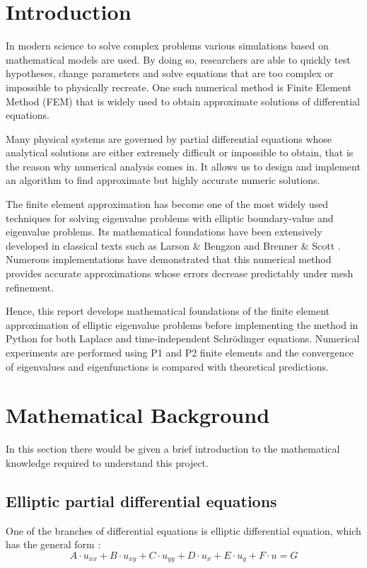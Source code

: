 \documentclass[acmsmall,screen]{MapleTrans}
\begin{document}
\section{Introduction}
In modern science to solve complex problems various simulations based on mathematical models are used.
By doing so, researchers are able to quickly test hypotheses, change parameters and solve equations that are too complex or impossible to physically recreate. 
One such numerical method is Finite Element Method (FEM) that is widely used to obtain approximate solutions of differential equations.

Many physical systems are governed by partial differential equations whose analytical solutions are either extremely difficult or impossible to obtain, that is the reason why numerical analysis comes in.
It allows us to design and implement an algorithm to find approximate but highly accurate numeric solutions. 

The finite element approximation has become one of the most widely used techniques for solving eigenvalue problems with elliptic boundary-value and eigenvalue problems. Its mathematical foundations have been extensively developed in classical texts such as Larson $\&$ Bengzon \cite{b10} and Brenner $\&$ Scott \cite{b0.0}. Numerous implementations have demonstrated that this numerical method provides accurate approximations whose errors decrease predictably under mesh refinement.

Hence, this report develops mathematical foundations of the finite element approximation of elliptic eigenvalue problems before implementing the method in Python for both Laplace and time-independent Schr\"{o}dinger equations. Numerical experiments are performed using P1 and P2 finite elements and the convergence of eigenvalues and eigenfunctions is compared with theoretical predictions.



\section{Mathematical Background}
In this section there would be given a brief introduction to the mathematical knowledge required to understand this project.

\subsection{Elliptic partial differential equations}
One of the branches of differential equations is elliptic differential equation, which has the general form \cite{b0}:
\begin{equation}
    A\cdot u_{xx} + B\cdot u_{xy} + C\cdot u_{yy} + D\cdot u_{x} + E\cdot u_{y} + F\cdot u = G
    \label{eq:elliptic PDE}
\end{equation}
\end{document}
